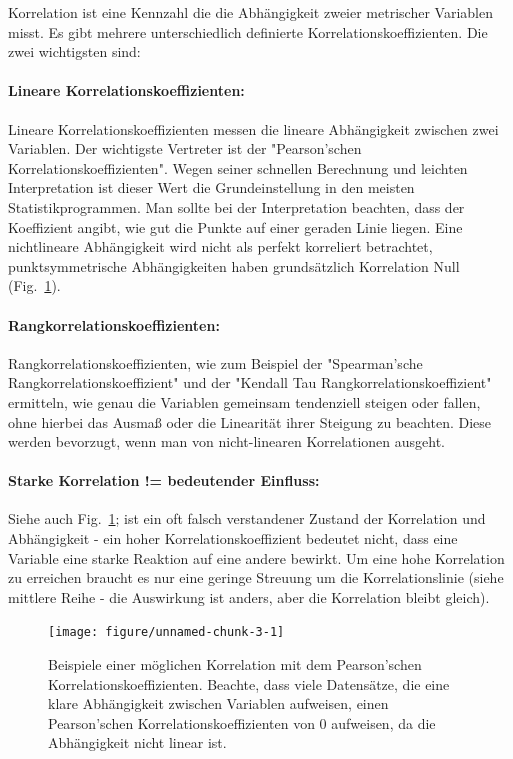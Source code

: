 \documentclass[a4paper,twoside]{tufte-book}\usepackage[]{graphicx}\usepackage[]{color}
\begin{document}
Korrelation ist eine Kennzahl die die Abhängigkeit zweier metrischer Variablen misst. Es gibt mehrere unterschiedlich definierte Korrelationskoeffizienten. Die zwei wichtigsten sind:

\paragraph{Lineare Korrelationskoeffizienten:} Lineare Korrelationskoeffizienten messen die lineare Abhängigkeit zwischen zwei Variablen. Der wichtigste Vertreter ist der "Pearson'schen Korrelationskoeffizienten". Wegen seiner schnellen Berechnung und leichten Interpretation ist dieser Wert die Grundeinstellung in den meisten Statistikprogrammen. Man sollte bei der Interpretation beachten, dass der Koeffizient angibt, wie gut die Punkte auf einer geraden Linie liegen. Eine nichtlineare Abhängigkeit wird nicht als perfekt korreliert betrachtet, punktsymmetrische Abhängigkeiten haben grundsätzlich Korrelation Null (Fig.~\ref{fig: correlation}).

\paragraph{Rangkorrelationskoeffizienten:} Rangkorrelationskoeffizienten, wie zum Beispiel der "Spearman'sche Rangkorrelationskoeffizient" und der "Kendall Tau Rangkorrelationskoeffizient" ermitteln, wie genau die Variablen gemeinsam tendenziell steigen oder fallen, ohne hierbei das Ausmaß oder die Linearität ihrer Steigung zu beachten. Diese werden bevorzugt, wenn man von nicht-linearen Korrelationen ausgeht. 

\paragraph{Starke Korrelation != bedeutender Einfluss:} Siehe auch Fig.~\ref{fig: correlation}; ist ein oft falsch verstandener Zustand der Korrelation und Abhängigkeit - ein hoher Korrelationskoeffizient bedeutet nicht, dass eine Variable eine starke Reaktion auf eine andere bewirkt. Um eine hohe Korrelation zu erreichen braucht es nur eine geringe Streuung um die Korrelationslinie (siehe mittlere Reihe - die Auswirkung ist anders, aber die Korrelation bleibt gleich). 


\begin{figure}[htbp]
\begin{center}
\begin{Schunk}

\texttt{[image: figure/unnamed-chunk-3-1]} \end{Schunk}
\caption{Beispiele einer möglichen Korrelation mit dem Pearson'schen Korrelationskoeffizienten. Beachte, dass viele Datensätze, die eine klare Abhängigkeit zwischen Variablen aufweisen, einen Pearson'schen Korrelationskoeffizienten von 0 aufweisen, da die Abhängigkeit nicht linear ist.}
\label{fig: correlation}
\end{center}
\end{figure}
\end{document}
